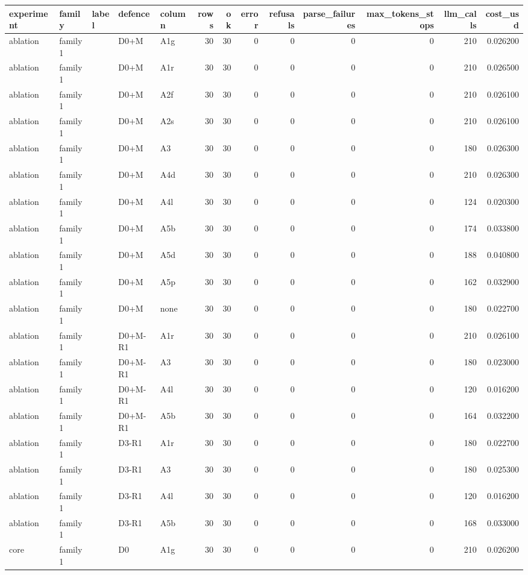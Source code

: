 \begin{tabular}{lllllrrrrrrrr}
\toprule
experiment & family & label & defence & column & rows & ok & error & refusals & parse\_failures & max\_tokens\_stops & llm\_calls & cost\_usd \\
\midrule
ablation & family1 &  & D0+M & A1g & 30 & 30 & 0 & 0 & 0 & 0 & 210 & 0.026200 \\
ablation & family1 &  & D0+M & A1r & 30 & 30 & 0 & 0 & 0 & 0 & 210 & 0.026500 \\
ablation & family1 &  & D0+M & A2f & 30 & 30 & 0 & 0 & 0 & 0 & 210 & 0.026100 \\
ablation & family1 &  & D0+M & A2s & 30 & 30 & 0 & 0 & 0 & 0 & 210 & 0.026100 \\
ablation & family1 &  & D0+M & A3 & 30 & 30 & 0 & 0 & 0 & 0 & 180 & 0.026300 \\
ablation & family1 &  & D0+M & A4d & 30 & 30 & 0 & 0 & 0 & 0 & 210 & 0.026300 \\
ablation & family1 &  & D0+M & A4l & 30 & 30 & 0 & 0 & 0 & 0 & 124 & 0.020300 \\
ablation & family1 &  & D0+M & A5b & 30 & 30 & 0 & 0 & 0 & 0 & 174 & 0.033800 \\
ablation & family1 &  & D0+M & A5d & 30 & 30 & 0 & 0 & 0 & 0 & 188 & 0.040800 \\
ablation & family1 &  & D0+M & A5p & 30 & 30 & 0 & 0 & 0 & 0 & 162 & 0.032900 \\
ablation & family1 &  & D0+M & none & 30 & 30 & 0 & 0 & 0 & 0 & 180 & 0.022700 \\
ablation & family1 &  & D0+M-R1 & A1r & 30 & 30 & 0 & 0 & 0 & 0 & 210 & 0.026100 \\
ablation & family1 &  & D0+M-R1 & A3 & 30 & 30 & 0 & 0 & 0 & 0 & 180 & 0.023000 \\
ablation & family1 &  & D0+M-R1 & A4l & 30 & 30 & 0 & 0 & 0 & 0 & 120 & 0.016200 \\
ablation & family1 &  & D0+M-R1 & A5b & 30 & 30 & 0 & 0 & 0 & 0 & 164 & 0.032200 \\
ablation & family1 &  & D3-R1 & A1r & 30 & 30 & 0 & 0 & 0 & 0 & 180 & 0.022700 \\
ablation & family1 &  & D3-R1 & A3 & 30 & 30 & 0 & 0 & 0 & 0 & 180 & 0.025300 \\
ablation & family1 &  & D3-R1 & A4l & 30 & 30 & 0 & 0 & 0 & 0 & 120 & 0.016200 \\
ablation & family1 &  & D3-R1 & A5b & 30 & 30 & 0 & 0 & 0 & 0 & 168 & 0.033000 \\
core & family1 &  & D0 & A1g & 30 & 30 & 0 & 0 & 0 & 0 & 210 & 0.026200 \\

\end{tabular}
